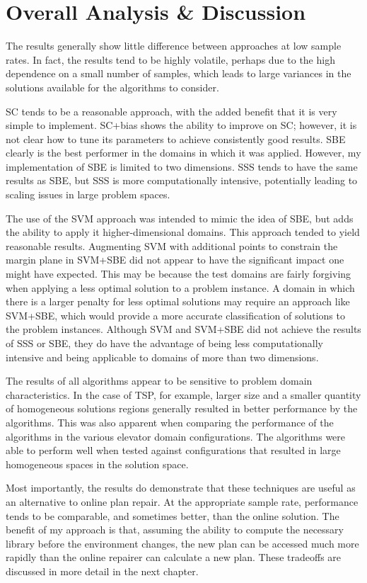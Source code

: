 \section{Overall Analysis \& Discussion}

The results generally show little difference between approaches at low sample rates.  In fact, the results tend to be highly volatile, perhaps due to the high dependence on a small number of samples, which leads to large variances in the solutions available for the algorithms to consider.

SC tends to be a reasonable approach, with the added benefit that it is very simple to implement.  SC+bias shows the ability to improve on SC; however, it is not clear how to tune its parameters to achieve consistently good results.  SBE clearly is the best performer in the domains in which it was applied.  However, my implementation of SBE is limited to two dimensions.  SSS tends to have  the same results as SBE, but SSS is more computationally intensive, potentially leading to scaling issues in large problem spaces.  

The use of the SVM approach was intended to mimic the idea of SBE, but adds the ability to apply it higher-dimensional domains.  This approach tended to yield reasonable results.  Augmenting SVM with additional points to constrain the margin plane in SVM+SBE did not appear to have the significant impact one might have expected.  This may be because the test domains are fairly forgiving when applying a less optimal solution to a problem instance.  A domain in which there is a larger penalty for less optimal solutions may require an approach like SVM+SBE, which would provide a more accurate classification of solutions to the problem instances.  Although SVM and SVM+SBE did not achieve the results of SSS or SBE, they do have the advantage of being less computationally intensive and being applicable to domains of more than two dimensions.

The results of all algorithms appear to be sensitive to problem domain characteristics.  In the case of TSP, for example, larger size and a smaller quantity of homogeneous solutions regions generally resulted in better performance by the algorithms. This was also apparent when comparing the performance of the algorithms in the various elevator domain configurations.  The algorithms were able to perform well when tested against configurations that resulted in large homogeneous spaces in the solution space.

Most importantly, the results do demonstrate that these techniques are useful as an alternative to online plan repair.  At the appropriate sample rate, performance tends to be comparable, and sometimes better, than the online solution.  The benefit of my approach is that, assuming the ability to compute the necessary library before the environment changes, the new plan can be accessed much more rapidly than the online repairer can calculate a new plan.  These tradeoffs are discussed in more detail in the next chapter.

